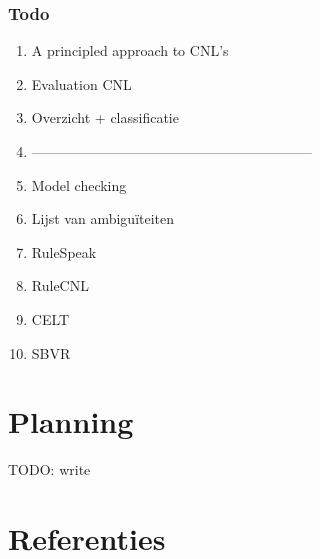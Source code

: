 \documentclass[]{article}
\theoremstyle{definition}
\begin{document}
\subsubsection{Todo}
\begin{enumerate}
  \item A principled approach to CNL's\cite{Kuhn2013} 
  \item Evaluation CNL\cite{Kuhn2010}
  \item Overzicht + classificatie\cite{Kuhn2014}
  \item ------------------------------------------------------------
  \item Model checking\cite{Flake2002, Konrad2005, Nelken, Jak2008}
  \item Lijst van ambiguïteiten \cite{Berry2003} 
  \item RuleSpeak\cite{Ross2009a, Ross2013, Ross2013a, Ross2009} 
  \item RuleCNL\cite{Njonko2014} 
  \item CELT\cite{Pease2010, Dellis2010}
  \item SBVR\cite{Spreeuwenberg2010, Levy2013} 
\end{enumerate}
			

\section{Planning}
TODO: write

\section{Referenties}


\end{document}

